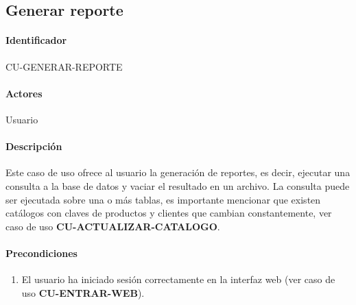 \subsection{Generar reporte}
\paragraph*{Identificador}
CU-GENERAR-REPORTE
\paragraph*{Actores}
Usuario
\paragraph*{Descripción}
Este caso de uso ofrece al usuario la generación de reportes, es decir, ejecutar una consulta a la base de datos y vaciar el resultado en un archivo. La consulta puede ser ejecutada sobre una o más tablas, es importante mencionar que existen catálogos con claves de productos y clientes que cambian constantemente, ver caso de uso \textbf{CU-ACTUALIZAR-CATALOGO}.
\paragraph*{Precondiciones}
\begin{enumerate}
  \item El usuario ha iniciado sesión correctamente en la interfaz web (ver caso de uso \textbf{CU-ENTRAR-WEB}).
\end{enumerate}
